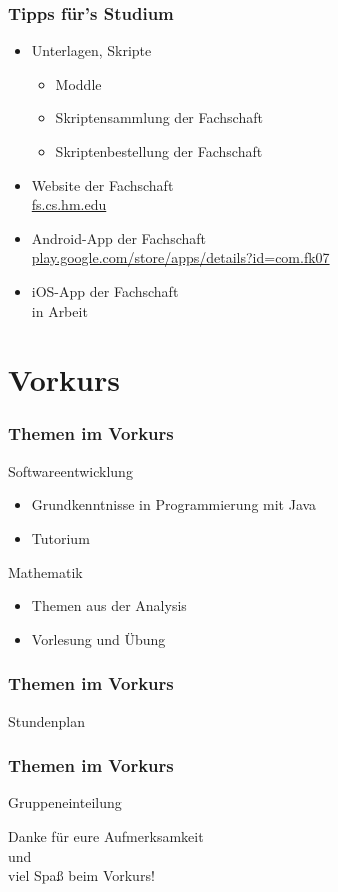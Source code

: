 \documentclass{beamer}
\begin{document}
	\begin{frame}[t]
		\frametitle{Tipps für's Studium}
		\begin{itemize}
			\item Unterlagen, Skripte 
			\begin{itemize}
				\item Moddle
				\item Skriptensammlung der Fachschaft
				\item Skriptenbestellung der Fachschaft
			\end{itemize}
			\pause
			\item Website der Fachschaft\\ \url{fs.cs.hm.edu}
			\pause
			\item Android-App der Fachschaft\\ \url{play.google.com/store/apps/details?id=com.fk07}
			\pause
			\item iOS-App der Fachschaft\\
			in Arbeit	
		\end{itemize}
	\end{frame}
	
	\section{Vorkurs}
	
	\begin{frame}
		\frametitle{Themen im Vorkurs}
		Softwareentwicklung
		\begin{itemize}
			\item Grundkenntnisse in Programmierung mit Java
			\item Tutorium
		\end{itemize}
		\bigskip
		Mathematik
		\begin{itemize}
			\item Themen aus der Analysis
			\item Vorlesung und Übung
		\end{itemize}
	\end{frame}
	
	\begin{frame}
		\frametitle{Themen im Vorkurs}
		Stundenplan
	\end{frame}
	
	\begin{frame}
		\frametitle{Themen im Vorkurs}
		Gruppeneinteilung
	\end{frame}
	
	\begin{frame}
		\center Danke für eure Aufmerksamkeit\\ und\\ viel Spaß beim Vorkurs!
	\end{frame}
\end{document}
